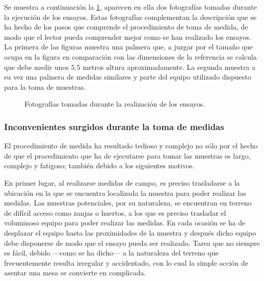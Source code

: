 Se muestra a continuación la \cref{fig:tests}, aparecen en ella dos
fotografías tomadas durante la ejecución de los ensayos. Estas fotografías
complementan la descripción que se ha hecho de los pasos que comprende el
procedimiento de toma de medida, de modo que el lector pueda comprender
mejor como se han realizado los ensayos. La primera de las figuras muestra
una palmera que, a juzgar por el tamaño que ocupa en la figura en
comparación con las dimensiones de la referencia se calcula que debe medir
unos $5.5$ metros altura aproximadamente. La segunda muestra a su vez una
palmera de medidas similares y parte del equipo utilizado dispuesto para la
toma de muestras.

\newlength{\biggestpalm}

\begin{figure}
    \begin{center}
    \end{center}
    \caption[Fotografías tomadas durante la realización de los
    ensayos]{Fotografías tomadas durante la realización de los ensayos.}
    \label{fig:tests}
\end{figure}


\subsubsection{Inconvenientes surgidos durante la toma de medidas}

El procedimiento de medida ha resultado tedioso y complejo no sólo por el
hecho de que el procedimiento que ha de ejecutarse para tomar las muestras
es largo, complejo y fatigoso; también debido a los siguientes motivos.

En primer lugar, al realizarse medidas de campo, es preciso trasladarse a
la ubicación en la que se encuentra localizada la muestra para poder
realizar las medidas. Las muestras potenciales, por su naturaleza, se
encuentran en terreno de difícil acceso como zanjas o huertos, a los que es
preciso trasladar el voluminoso equipo para poder realizar las medidas. En
cada ocasión se ha de desplazar el equipo hasta las proximidades de la
muestra y después dicho equipo debe disponerse de modo que el ensayo pueda
ser realizado. Tarea que no siempre es fácil, debido ---como se ha dicho---
a la naturaleza del terreno que frecuentemente resulta irregular y
accidentado, con lo cual la simple acción de asentar una mesa se convierte
en complicada.

